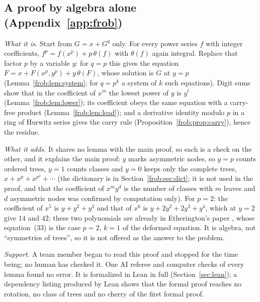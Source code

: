 \documentclass[11pt]{article}
\theoremstyle{definition}
\theoremstyle{remark}
\numberwithin{equation}{section}
\numberwithin{figure}{section}
\begin{document}
\subsection{A proof by algebra alone (Appendix~\ref{app:frob})}
\emph{What it is.} Start from $G=x+G^q$ only. For every power series $f$ with integer coefficients,
$f^p=f(x^p)+p\,\theta(f)$ with $\theta(f)$ again integral. Replace that factor $p$ by a variable $y$: for
$q=p$ this gives the equation $F=x+F(x^p,y^p)+y\,\theta(F)$, whose solution is $G$ at $y=p$
(Lemma~\ref{frob:lem:system}; for $q=p^k$ a system of $k$ such equations). Digit sums show that in the
coefficient of $x^m$ the lowest power of $y$ is $y^t$ (Lemma~\ref{frob:lem:lower}); its coefficient obeys the
same equation with a carry-free product (Lemma~\ref{frob:lem:lead}); and a derivative identity modulo $p$ in a
ring of Hurwitz series gives the carry rule (Proposition~\ref{frob:prop:carry}), hence the residue.

\emph{What it adds.} It shares no lemma with the main proof, so each is a check on the other, and it explains
the main proof: $y$ marks asymmetric nodes, so $y=p$ counts ordered trees, $y=1$ counts classes and $y=0$
keeps only the complete trees, $x+x^p+x^{p^2}+\cdots$ (the dictionary is in Section~\ref{frob:sec:dict}; it
is not used in the proof, and that the coefficient of $x^my^d$ is the number of classes with $m$ leaves and
$d$ asymmetric nodes was confirmed by computation only). For $p=2$: the coefficient of $x^5$ is $y+y^2+y^3$
and that of $x^6$ is $y+2y^2+2y^3+y^4$, which at $y=2$ give $14$ and $42$; these two polynomials are already
in Etherington's paper \cite{Etherington}, whose equation~(33) is the case $p=2$, $k=1$ of the deformed
equation. It is algebra, not ``symmetries of trees'', so it is not offered as the answer to the problem.

\emph{Support.} A team member began to read this proof and stopped for the time being; no human has checked
it. One AI referee and computer checks of every lemma found no error. It is formalized in Lean in full (Section~\ref{sec:lean}); a dependency listing produced by Lean shows
that the formal proof reaches no rotation, no class of trees and no cherry of the first formal proof.
\end{document}
